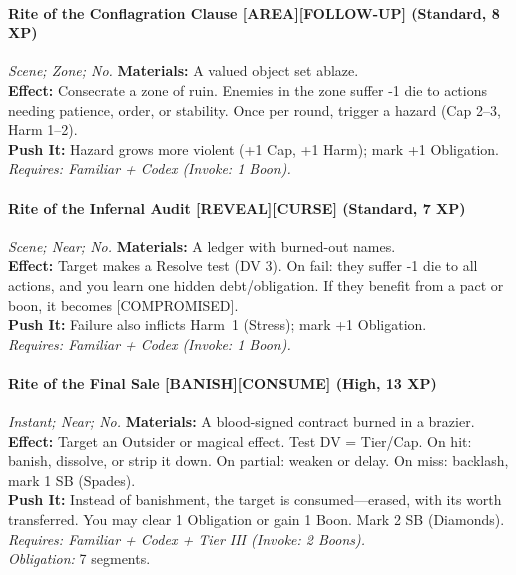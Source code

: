 \paragraph{Rite of the Conflagration Clause \textnormal{[AREA][FOLLOW-UP]} (Standard, 8 XP)} \emph{Scene; Zone; No.}  
\textbf{Materials:} A valued object set ablaze.\\
\textbf{Effect:} Consecrate a zone of ruin. Enemies in the zone suffer -1 die to actions needing patience, order, or stability. Once per round, trigger a hazard (Cap 2–3, Harm 1–2).\\
\textbf{Push It:} Hazard grows more violent (+1 Cap, +1 Harm); mark +1 Obligation.\\
\emph{Requires: Familiar + Codex (\textit{Invoke:} 1 Boon).}

\paragraph{Rite of the Infernal Audit \textnormal{[REVEAL][CURSE]} (Standard, 7 XP)} \emph{Scene; Near; No.}  
\textbf{Materials:} A ledger with burned-out names.\\
\textbf{Effect:} Target makes a Resolve test (DV 3). On fail: they suffer -1 die to all actions, and you learn one hidden debt/obligation. If they benefit from a pact or boon, it becomes [COMPROMISED].\\
\textbf{Push It:} Failure also inflicts Harm~1 (Stress); mark +1 Obligation.\\
\emph{Requires: Familiar + Codex (\textit{Invoke:} 1 Boon).}

\paragraph{Rite of the Final Sale \textnormal{[BANISH][CONSUME]} (High, 13 XP)} \emph{Instant; Near; No.}  
\textbf{Materials:} A blood-signed contract burned in a brazier.\\
\textbf{Effect:} Target an Outsider or magical effect. Test DV = Tier/Cap. On hit: banish, dissolve, or strip it down. On partial: weaken or delay. On miss: backlash, mark 1 SB (Spades).\\
\textbf{Push It:} Instead of banishment, the target is consumed—erased, with its worth transferred. You may clear 1 Obligation or gain 1 Boon. Mark 2 SB (Diamonds).\\
\emph{Requires: Familiar + Codex + Tier III (\textit{Invoke:} 2 Boons).}\\
\emph{Obligation:} 7 segments.

